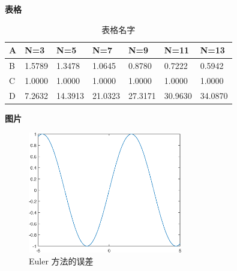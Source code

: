 \documentclass[12pt,cn]{homework}
\begin{document}

\clearpage

\noindent\textbf{表格}

\begin{table}[ht!]
\caption{表格名字}
\label{tab:3}
\centering
\begin{tabular}{lllllll}
\toprule
  A & N=3 &N=5 & N=7 & N=9 & N=11 & N=13\\
\midrule
  B & 1.5789 & 1.3478 &1.0645&0.8780 &0.7222 &0.5942   \\
   C &  1.0000 &1.0000 &1.0000 &1.0000 &1.0000 &1.0000  \\
D &7.2632 &14.3913 &21.0323 &27.3171 &30.9630 &34.0870   \\
\bottomrule
\end{tabular}
\end{table}


\noindent\textbf{图片}

\begin{figure}[htp!]
\centering
  \includegraphics[width=0.6\textwidth]{image1}
   \caption{Euler 方法的误差}
   \label{fig:error1}
\end{figure}
\end{document}
